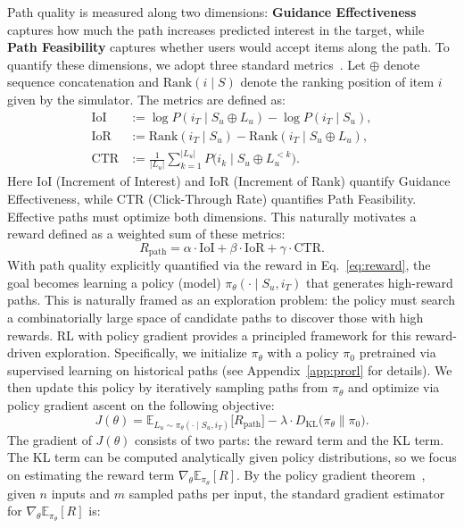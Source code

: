 \documentclass{llmxive}
\begin{document}
Path quality is measured along two dimensions: \textbf{Guidance Effectiveness} captures how much the path increases predicted interest in the target, while \textbf{Path Feasibility} captures whether users would accept items along the path. To quantify these dimensions, we adopt three standard metrics~\cite{zhu2023influential,bi2024proactive}. Let $\oplus$ denote sequence concatenation and $\mathrm{Rank}(i \mid S)$ denote the ranking position of item $i$ given by the simulator. The metrics are defined as:
\begin{align}
\mathrm{IoI} &:= \log P(i_T \mid S_u \oplus L_u) - \log P(i_T \mid S_u), \nonumber\\
\mathrm{IoR} &:= \mathrm{Rank}(i_T \mid S_u) - \mathrm{Rank}(i_T \mid S_u \oplus L_u), \nonumber\\
\mathrm{CTR} &:= \frac{1}{|L_u|} \sum_{k=1}^{|L_u|} P\bigl(i_k \mid S_u \oplus L_u^{<k}\bigr). \nonumber
\end{align}
Here IoI (Increment of Interest) and IoR (Increment of Rank) quantify Guidance Effectiveness, while CTR (Click-Through Rate) quantifies Path Feasibility. Effective paths must optimize both dimensions. This naturally motivates a reward defined as a weighted sum of these metrics:
\begin{equation}
R_{\text{path}} = \alpha \cdot \mathrm{IoI} + \beta \cdot \mathrm{IoR} + \gamma \cdot \mathrm{CTR}.
\label{eq:reward}
\end{equation}
With path quality explicitly quantified via the reward in Eq.~\eqref{eq:reward}, the goal becomes learning a policy (model) $\pi_\theta(\cdot \mid S_u, i_T)$ that generates high-reward paths. This is naturally framed as an exploration problem: the policy must search a combinatorially large space of candidate paths to discover those with high rewards. 
RL with policy gradient provides a principled framework for this reward-driven exploration. Specifically, we initialize $\pi_\theta$ with a policy $\pi_0$ pretrained via supervised learning on historical paths (see Appendix~\ref{app:prorl} for details). We then update this policy by iteratively sampling paths from $\pi_\theta$ and optimize via policy gradient ascent on the following objective:
\begin{equation}
J(\theta) = \mathbb{E}_{L_u \sim \pi_\theta(\cdot \mid S_u, i_T)}\bigl[R_{\text{path}}\bigr] - \lambda \cdot D_{\mathrm{KL}}\bigl(\pi_\theta \| \pi_0\bigr).
\label{eq:objective}
\end{equation}
The gradient of $J(\theta)$ consists of two parts: the reward term and the KL term. The KL term can be computed analytically given policy distributions, so we focus on estimating the reward term $\nabla_\theta \mathbb{E}_{\pi_\theta}[R]$. By the policy gradient theorem~\cite{sutton1999policy}, given $n$ inputs and $m$ sampled paths per input, the standard gradient estimator for $\nabla_\theta \mathbb{E}_{\pi_\theta}[R]$ is:
\end{document}

